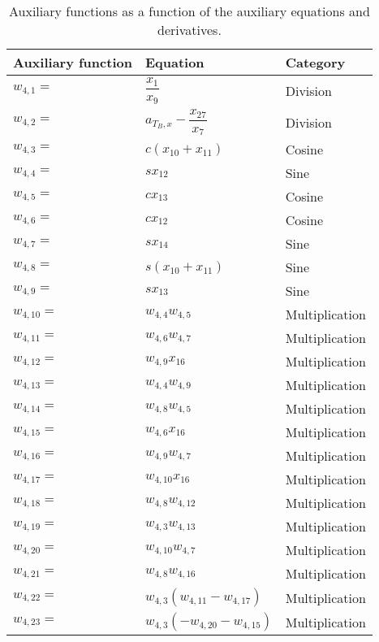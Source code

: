\begin{longtable}{|p{1.5cm}|l|p{2cm}|}
\caption{Auxiliary functions as a function of the auxiliary equations and derivatives.}
\label{tab:auxFunc}
\endfirsthead
\endhead
\hline
\textbf{Auxiliary function} & \textbf{Equation} & \textbf{Category}  \\ \hline \hline
\hline 
$w_{4,1}=$  & $ \dfrac{x_{1}}{x_{9}} $ & Division \\ \hline
$w_{4,2}=$  & $ a_{T_{B},x}-\dfrac{x_{27}}{x_{7}} $ & Division \\ \hline
$w_{4,3}=$  & $ c\left(x_{10}+x_{11}\right) $ & Cosine  \\ \hline
$w_{4,4}=$  & $ sx_{12} $ & Sine \\ \hline
$w_{4,5}=$  & $ cx_{13} $ & Cosine  \\ \hline
$w_{4,6}=$  & $ cx_{12} $ & Cosine \\ \hline
$w_{4,7}=$  & $ sx_{14} $ & Sine \\ \hline
$w_{4,8}=$  & $ s\left(x_{10}+x_{11}\right) $ & Sine \\ \hline
$w_{4,9}=$ & $ sx_{13} $ & Sine \\ \hline
$w_{4,10}=$ & $ w_{4,4}w_{4,5} $ & Multiplication  \\ \hline
$w_{4,11}=$ & $ w_{4,6}w_{4,7} $ &  Multiplication \\ \hline
$w_{4,12}=$ & $ w_{4,9}x_{16} $ & Multiplication  \\ \hline
$w_{4,13}=$ & $ w_{4,4}w_{4,9} $ &  Multiplication \\ \hline
$w_{4,14}=$ & $ w_{4,8}w_{4,5} $ & Multiplication \\ \hline
$w_{4,15}=$ & $ w_{4,6}x_{16} $ &  Multiplication \\ \hline
$w_{4,16}=$ & $ w_{4,9}w_{4,7} $ & Multiplication  \\ \hline
$w_{4,17}=$ & $ w_{4,10}x_{16} $ & Multiplication \\ \hline
$w_{4,18}=$ & $ w_{4,8}w_{4,12} $ & Multiplication  \\ \hline
$w_{4,19}=$ & $ w_{4,3}w_{4,13} $ &  Multiplication \\ \hline
$w_{4,20}=$ & $ w_{4,10}w_{4,7} $ &  Multiplication \\ \hline
$w_{4,21}=$ & $ w_{4,8}w_{4,16} $ &  Multiplication \\ \hline
$w_{4,22}=$ & $ w_{4,3}\left(w_{4,11}-w_{4,17}\right) $ & Multiplication  \\ \hline
$w_{4,23}=$ & $ w_{4,3}\left(-w_{4,20}-w_{4,15}\right) $ &  Multiplication \\ \hline

\end{longtable}
